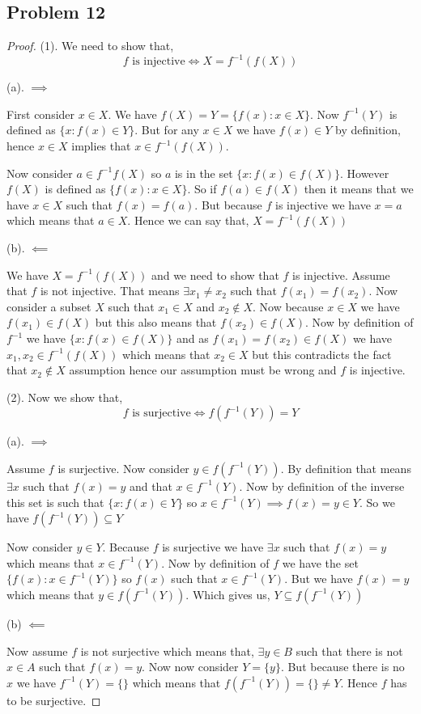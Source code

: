 \documentclass[a4paper]{report}
\begin{document}
\subsection*{Problem 12}
\begin{proof}
    (1). We need to show that, 
    $$f \text{ is injective} \iff X = f^{-1}(f(X)) $$ 

    (a). $\implies$ 
    
    First consider $x \in X$. We have $f(X) = Y = \{f(x): x \in X\}$. Now $f^{-1}(Y)$ is defined as $\{x: f(x) \in Y\}$.  But for any $x \in X$ we have $f(x) \in Y$ by definition, hence $x \in X$ implies that $x \in f^{-1}(f(X))$.

    Now consider $a \in f^{-1}f(X)$ so $a$ is in the set $\{x : f(x) \in f(X)\}$. However  $f(X)$ is defined as $\{f(x): x \in X\}$. So  if  $f(a) \in f(X)$ then it means that we have $x \in X$ such that $f(x) = f(a)$. But because  $f$ is injective we have $x = a$ which means that  $a \in X$. Hence we can say that, $X = f^{-1}(f(X))$

    (b). $\impliedby$

    We have  $X = f^{-1}(f(X))$ and we need to show that $f$ is injective.  Assume that $f$ is not injective. That means $\exists x_1 \ne x_2$ such that $f(x_1) = f(x_2)$. Now consider a subset $X$ such that $x_1 \in X$ and $x_2 \not \in X$. Now because $x \in X$ we have $f(x_1) \in f(X)$ but this also means that $f(x_2) \in f(X)$. Now by definition of $f^{-1}$ we have $\{x: f(x) \in f(X)\}$ and as  $f(x_1) = f(x_2) \in f(X)$ we have $x_1,x_2 \in f^{-1}(f(X))$ which means that $x_2 \in X$ but this contradicts the fact that $x_2 \not \in X$ assumption hence our assumption must be wrong and $f$ is injective.



    (2). Now we show that, 
    $$ f \text{ is surjective} \iff f(f^{-1}(Y)) = Y $$

    
    (a). $\implies$
    
    Assume $f$ is surjective. Now consider $y \in f(f^{-1}(Y))$. By definition that means $\exists x$ such that $f(x) = y$ and that  $x \in f^{-1}(Y)$. Now by definition of the inverse this set is such that $\{x: f(x) \in Y\}$ so $x \in f^{-1}(Y) \implies f(x) = y \in Y$. So we have $f(f^{-1}(Y)) \subseteq Y$ 

    Now consider $y \in Y$. Because $f$ is surjective we have $\exists x$ such that $f(x) = y$ which means that $x \in f^{-1}(Y)$. Now by definition of $f$ we have the set $\{f(x): x \in f^{-1}(Y)\}$ so $f(x)$ such that $x \in f^{-1}(Y)$. But we have $f(x) = y$ which means that $y \in f(f^{-1}(Y))$. Which gives us, $Y \subseteq f(f^{-1}(Y))$


    (b) $\impliedby$ 

    Now assume $f$ is not surjective which means that, $\exists y \in B$ such that there is not $x \in A$ such that $f(x) = y$. Now now consider  $Y = \{y\}$. But because there is no  $x$ we have $f^{-1}(Y) = \{\}$ which means that $f(f^{-1}(Y)) = \{\} \ne Y$. Hence $f$ has to be surjective.
\end{proof}
\end{document}
